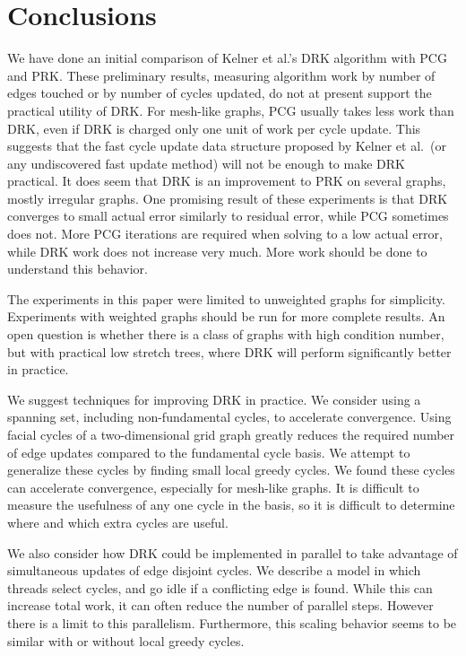 \documentclass{sig-alternate}
\begin{document}
\section{Conclusions}
We have done an initial comparison of Kelner et al.'s
DRK algorithm with PCG and PRK.
These preliminary results, measuring algorithm work by number of
edges touched or by number of cycles updated,
do not at present support the practical utility of DRK.
For mesh-like graphs, PCG usually takes less work than DRK, even if
DRK is charged only one unit of work per cycle update.
This suggests that the fast cycle update data structure proposed
by Kelner et al.\ (or any undiscovered fast update method) will not
be enough to make DRK practical.
It does seem that DRK is an improvement to PRK on several graphs,
mostly irregular graphs. One promising result of these experiments
is that DRK converges to small actual error similarly
to residual error, while PCG sometimes does not.
More PCG iterations are required
when solving to a low actual error, while DRK work does not
increase very much. More work should be done to
understand this behavior.

The experiments in this paper were limited to unweighted graphs
for simplicity.
Experiments with weighted graphs should be run for more
complete results.
An open question is whether there is a class of graphs with high
condition number, but with practical low stretch trees, where DRK
will perform significantly better in practice.

We suggest techniques for improving DRK in practice.
We consider using a spanning set, including non-fundamental
cycles, to accelerate
convergence. Using facial cycles of a two-dimensional grid graph
greatly reduces the required number of edge updates compared
to the fundamental cycle basis. We attempt to generalize these
cycles by finding small local greedy cycles. We found these
cycles can accelerate convergence, especially for mesh-like graphs.
It is difficult to
measure the usefulness of any one cycle in the basis, so it
is difficult to determine where and which extra cycles are
useful.

We also consider how DRK could be implemented in parallel to take
advantage of simultaneous updates of edge disjoint cycles. We
describe a model in which threads select cycles, and go idle
if a conflicting edge is found. While this can
increase total work, it can often
reduce the number of parallel steps.
However there is a limit to this parallelism.
Furthermore, this scaling behavior seems to be similar
with or without local greedy cycles.
\end{document}
